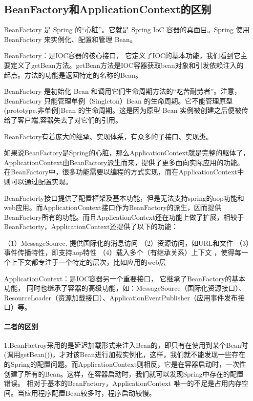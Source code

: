\documentclass[../../../interview-questions.tex]{subfiles}
\begin{document}
\subsection{BeanFactory和ApplicationContext的区别}


BeanFactory 是 Spring 的“心脏”。它就是 Spring IoC 容器的真面目。Spring 使用 BeanFactory 来实例化、配置和管理 Bean。

BeanFactory：是IOC容器的核心接口， 它定义了IOC的基本功能，我们看到它主要定义了getBean方法。getBean方法是IOC容器获取bean对象和引发依赖注入的起点。方法的功能是返回特定的名称的Bean。

BeanFactory 是初始化 Bean 和调用它们生命周期方法的“吃苦耐劳者”。注意，BeanFactory 只能管理单例（Singleton）Bean 的生命周期。它不能管理原型(prototype,非单例)Bean 的生命周期。这是因为原型 Bean 实例被创建之后便被传给了客户端,容器失去了对它们的引用。

BeanFactory有着庞大的继承、实现体系，有众多的子接口、实现类。


如果说BeanFactory是Spring的心脏，那么ApplicationContext就是完整的躯体了，ApplicationContext由BeanFactory派生而来，提供了更多面向实际应用的功能。在BeanFactory中，很多功能需要以编程的方式实现，而在ApplicationContext中则可以通过配置实现。

BeanFactorty接口提供了配置框架及基本功能，但是无法支持spring的aop功能和web应用。而ApplicationContext接口作为BeanFactory的派生，因而提供BeanFactory所有的功能。而且ApplicationContext还在功能上做了扩展，相较于BeanFactorty，ApplicationContext还提供了以下的功能： 

（1）MessageSource, 提供国际化的消息访问  
（2）资源访问，如URL和文件  
（3）事件传播特性，即支持aop特性
（4）载入多个（有继承关系）上下文 ，使得每一个上下文都专注于一个特定的层次，比如应用的web层 

ApplicationContext：是IOC容器另一个重要接口， 它继承了BeanFactory的基本功能， 同时也继承了容器的高级功能，如：MessageSource（国际化资源接口）、ResourceLoader（资源加载接口）、ApplicationEventPublisher（应用事件发布接口）等。

\paragraph{二者的区别}

1.BeanFactroy采用的是延迟加载形式来注入Bean的，即只有在使用到某个Bean时(调用getBean())，才对该Bean进行加载实例化，这样，我们就不能发现一些存在的Spring的配置问题。而ApplicationContext则相反，它是在容器启动时，一次性创建了所有的Bean。这样，在容器启动时，我们就可以发现Spring中存在的配置错误。 相对于基本的BeanFactory，ApplicationContext 唯一的不足是占用内存空间。当应用程序配置Bean较多时，程序启动较慢。
\end{document}
